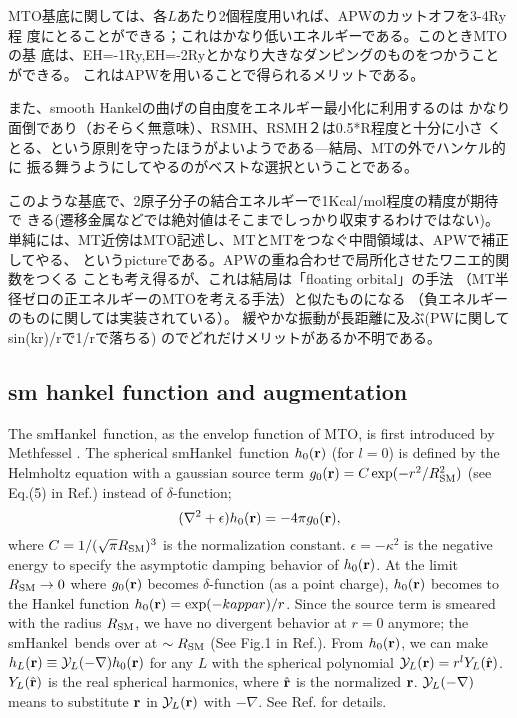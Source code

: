 \documentclass[a4paper,10pt,aip,onecolumn,amsmath,amssymb,floatfix,rmp]{revtex4-1}
\newcommand{\bfr}{{\bf r}}
\newcommand{\YY}{{\cal Y}}
\def\smh{smHankel}
\def\RSM{R_{\rm SM}}
\begin{document}
MTO基底に関しては、各$L$あたり2個程度用いれば、APWのカットオフを3-4Ry程
度にとることができる；これはかなり低いエネルギーである。このときMTOの基
底は、EH=-1Ry,EH=-2Ryとかなり大きなダンピングのものをつかうことができる。
これはAPWを用いることで得られるメリットである。

また、smooth Hankelの曲げの自由度をエネルギー最小化に利用するのは
かなり面倒であり（おそらく無意味）、RSMH、RSMH２は0.5*R程度と十分に小さ
くとる、という原則を守ったほうがよいようである---結局、MTの外でハンケル的に
振る舞うようにしてやるのがベストな選択ということである。

このような基底で、2原子分子の結合エネルギーで1Kcal/mol程度の精度が期待で
きる(遷移金属などでは絶対値はそこまでしっかり収束するわけではない)。
単純には、MT近傍はMTO記述し、MTとMTをつなぐ中間領域は、APWで補正してやる、
というpictureである。APWの重ね合わせで局所化させたワニエ的関数をつくる
ことも考え得るが、これは結局は「floating orbital」の手法
（MT半径ゼロの正エネルギーのMTOを考える手法）と似たものになる
（負エネルギーのものに関しては実装されている）。
緩やかな振動が長距離に及ぶ(PWに関してsin(kr)/rで1/rで落ちる)
のでどれだけメリットがあるか不明である。



\subsection{sm hankel function and augmentation}
\label{sec:smh}
The \smh\ function, as the envelop function of MTO, is first introduced
by Methfessel \cite{lmfchap,Bott98}. The spherical \smh\ function
$h_0(\bfr)$ (for $l=0$) is defined by the Helmholtz equation with a
gaussian source term $g_0(\bfr) = C \exp(-r^2/\RSM^2)$ (see Eq.(5) in
Ref.) instead of $\delta$-function;
\begin{equation}
(\nabla^2+\epsilon)h_0(\bfr) = -4 \pi g_0(\bfr),
\label{eq:defh0}
\end{equation}
where $C=1/(\sqrt{\pi} \RSM)^3$ is the normalization constant.
$\epsilon=-\kappa^2$ is the negative energy to specify the asymptotic
damping behavior of $h_0(\bfr)$.  At the limit $\RSM \to 0$ where
$g_0(\bfr)$ becomes $\delta$-function (as a point charge), $h_0(\bfr)$
becomes to the Hankel function $h_0(\bfr)=\exp(-kappa r)/r$.  Since the
source term is smeared with the radius $\RSM$, we have no divergent
behavior at $r=0$ anymore; the \smh\ bends over at $\sim\RSM$ (See Fig.1
in Ref.).  From $h_0(\bfr)$, we can make
$h_L(\bfr)\equiv\YY_L(-\nabla) h_0(\bfr)$ for any $L$ with the spherical
polynomial $\YY_L(\bfr)=r^l Y_L(\hat{\bfr})$.  $Y_L(\hat{\bfr})$ is the
real spherical harmonics, where $\hat{\bfr}$ is the normalized
$\bfr$. $\YY_L(-\nabla)$ means to substitute $\bfr$ in $\YY_L(\bfr)$
with $-\nabla$. See Ref. for details.
\end{document}
